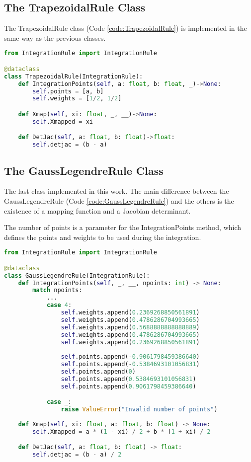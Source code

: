 \subsection{The TrapezoidalRule Class}
The TrapezoidalRule class (Code \ref{code:TrapezoidalRule}) is implemented in the same way as the previous classes.
\begin{lstlisting}[language=python, caption={TrapezoidalRule Class.}, label={code:TrapezoidalRule}]
from IntegrationRule import IntegrationRule

@dataclass
class TrapezoidalRule(IntegrationRule):
    def IntegrationPoints(self, a: float, b: float, _)->None:
        self.points = [a, b]
        self.weights = [1/2, 1/2]

    def Xmap(self, xi: float, _, __)->None:
        self.Xmapped = xi

    def DetJac(self, a: float, b: float)->float:
        self.detjac = (b - a)
\end{lstlisting}

\subsection{The GaussLegendreRule Class}
The last class implemented in this work. The main difference between the GaussLegendreRule (Code \ref{code:GaussLegendreRule}) and the others is the existence of a mapping function and a Jacobian determinant. 

The number of points is a parameter for the IntegrationPoints method, which defines the points and weights to be used during the integration.
\begin{lstlisting}[language=python, caption={GaussLegendreRule Class.}, label={code:GaussLegendreRule}]
from IntegrationRule import IntegrationRule

@dataclass
class GaussLegendreRule(IntegrationRule):
    def IntegrationPoints(self, _, __, npoints: int) -> None:
        match npoints:
            ...
            case 4:
                self.weights.append(0.2369268850561891)
                self.weights.append(0.4786286704993665)
                self.weights.append(0.5688888888888889)
                self.weights.append(0.4786286704993665)
                self.weights.append(0.2369268850561891)
                
                self.points.append(-0.9061798459386640)
                self.points.append(-0.5384693101056831)
                self.points.append(0)
                self.points.append(0.5384693101056831)
                self.points.append(0.9061798459386640)

            case _:
                raise ValueError("Invalid number of points")
            
    def Xmap(self, xi: float, a: float, b: float) -> None:
        self.Xmapped = a * (1 - xi) / 2 + b * (1 + xi) / 2

    def DetJac(self, a: float, b: float) -> float:
        self.detjac = (b - a) / 2
\end{lstlisting}

